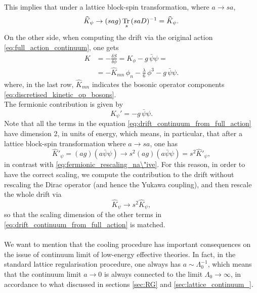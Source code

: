 This implies that under a lattice block-spin transformation, where $a \to sa$,
\begin{equation}
    \widehat{K}_{\psi} \to  (sag) \, \underset{s}{\operatorname{\text{Tr} \,}}{(saD)^{-1}} = \widehat{K}_{\psi}.
    \label{eq:fermionic_rescaling_na\"ive}
\end{equation}
On the other side, when computing the drift via the original action \eqref{eq:full_action_continuum}, one gets
\begin{equation}
    \begin{aligned}
        K &= - \frac{\delta S}{\delta \phi} = K_\phi - g \, \bar\psi\psi = \\
        &= - \hat K_{mn} \, \phi_n - \frac{\lambda}{6} \, \phi^3 - g \, \bar\psi\psi.
    \end{aligned}
    \label{eq:drift_continuum_from_full_action}
\end{equation}
where, in the last row, $\widehat{K}_{mn}$ indicates the bosonic operator components \eqref{eq:discretised_kinetic_op_bosons}.\\
The fermionic contribution is given by
\begin{equation*}
    K_{\psi}' = - g \, \bar\psi\psi.
\end{equation*}
Note that all the terms in the equation \eqref{eq:drift_continuum_from_full_action} have dimension 2, in units of energy, which means, in particular, that after a lattice block-spin transformation where $a \to sa$, one has
\begin{equation}
    \widehat{K}'_\psi = (ag) (a\bar\psi \psi) \to s^2 (ag) (a\bar\psi \psi) = s^2 \widehat{K}'_\psi,
    \label{eq:rescaling_blinear}
\end{equation}
in contrast with \eqref{eq:fermionic_rescaling_na\"ive}. For this reason, in order to have the correct scaling, we compute the contribution to the drift without rescaling the Dirac operator (and hence the Yukawa coupling), and then rescale the whole drift via 
\begin{equation*}
    \widehat{K}_\psi \to s^2 \widehat{K}_\psi,
\end{equation*}
so that the scaling dimension of the other terms in \eqref{eq:drift_continuum_from_full_action} is matched. \\~\\
We want to mention that the cooling procedure has important consequences on the issue of continuum limit of low-energy effective theories. In fact, in the standard lattice regularisation procedure, one always has $a \sim \Lambda_0^{-1}$, which means that the continuum limit $a \to 0$ is always connected to the limit $\Lambda_0 \to \infty$, in accordance to what discussed in sections \ref{sec:RG} and \ref{sec:lattice_continuum_}.

